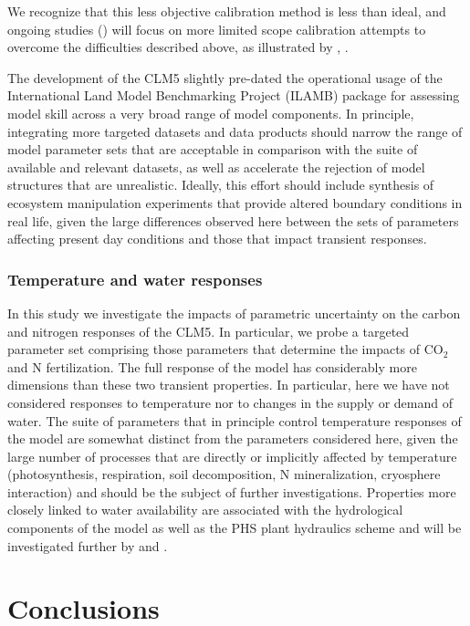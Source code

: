 \documentclass[draft,linenumbers]{agujournal}
\begin{document}
We recognize that this less objective calibration method is less than ideal, and ongoing studies (\cite{dagon}) will focus on more limited scope calibration attempts to overcome the difficulties described above, as illustrated by \cite{fer2018}, .  

The development of the CLM5 slightly pre-dated the operational usage of the International Land Model Benchmarking Project (ILAMB) package \cite{collier2018} for assessing model skill across a very broad range of model components.  In principle, integrating more targeted datasets and data products should narrow the range of model parameter sets that are acceptable in comparison with the suite of available and relevant datasets, as well as accelerate the rejection of model structures that are unrealistic. Ideally, this effort should include synthesis of ecosystem manipulation experiments that provide altered boundary conditions in real life, given the large differences observed here between the sets of parameters affecting present day conditions and those that impact transient responses.

\subsubsection{Temperature and water responses}
In this study we investigate the impacts of parametric uncertainty on the carbon and nitrogen responses of the CLM5. In particular, we probe a targeted parameter set comprising those parameters that determine the impacts of CO$_{2}$ and N fertilization. The full response of the model has considerably more dimensions than these two transient properties. In particular, here we have not considered responses to temperature nor to changes in the supply or demand of water. The suite of parameters that in principle control temperature responses of the model are somewhat distinct from the parameters considered here, given the large number of processes that are directly or implicitly affected by temperature (photosynthesis, respiration, soil decomposition, N mineralization, cryosphere interaction) and should be the subject of further investigations. Properties more closely linked to water availability are associated with the hydrological components of the model as well as the PHS plant hydraulics scheme and will be investigated further by \cite{dagon} and \cite{kennedy}. 


\section{Conclusions}
\end{document}
